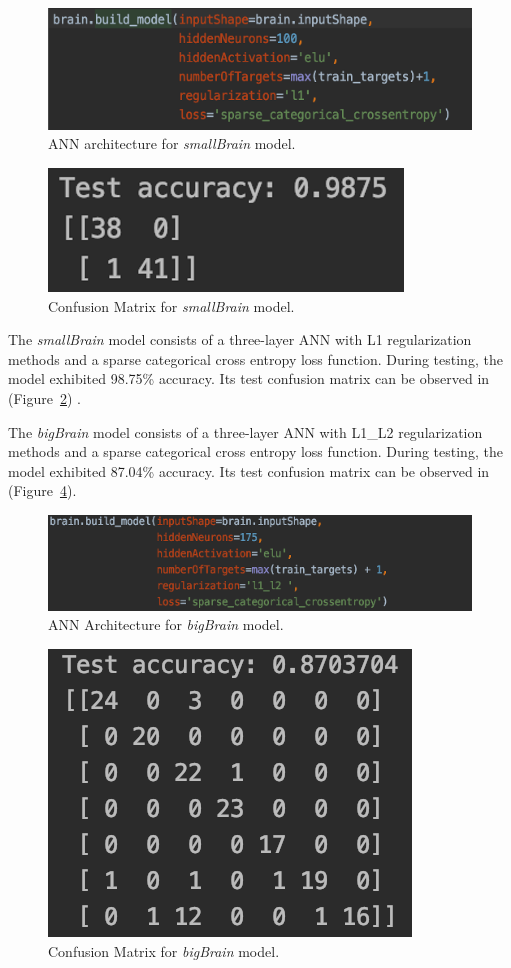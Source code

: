 \begin{figure}[htbp]
	\centering
		\includegraphics[width=1\columnwidth]{smallBrain.png}
	\caption{ANN architecture for \textit{smallBrain} model.}
	\label{fig:smallBrain}
\end{figure} 

\begin{figure}[htbp]
	\centering
		\includegraphics[width=0.5\columnwidth]{smallBrainConfusion.png}
	\caption{Confusion Matrix for \textit{smallBrain} model.}
	\label{fig:smallBrainConfusion}
\end{figure} 


The \textit{smallBrain} model consists of a three-layer ANN with L1 regularization methods and a sparse categorical cross entropy loss function. During testing, the model exhibited 98.75\% accuracy. Its test confusion matrix can be observed in (Figure~\ref{fig:smallBrainConfusion}) .


The \textit{bigBrain} model consists of a three-layer ANN with L1\_L2 regularization methods and a sparse categorical cross entropy loss function.  During testing, the model exhibited 87.04\% accuracy. Its test confusion matrix can be observed in (Figure~\ref{fig:bigBrainConfusion}).

\begin{figure}[htbp]
	\centering
		\includegraphics[width=1\columnwidth]{bigBrain.png}
	\caption{ANN Architecture for \textit{bigBrain} model.}
	\label{fig:bigBrain}
\end{figure} 

 \begin{figure}[htbp]
	\centering
		\includegraphics[width=0.75\columnwidth]{bigBrainConfusion.png}
	\caption{Confusion Matrix for \textit{bigBrain} model.}
	\label{fig:bigBrainConfusion}
\end{figure} 